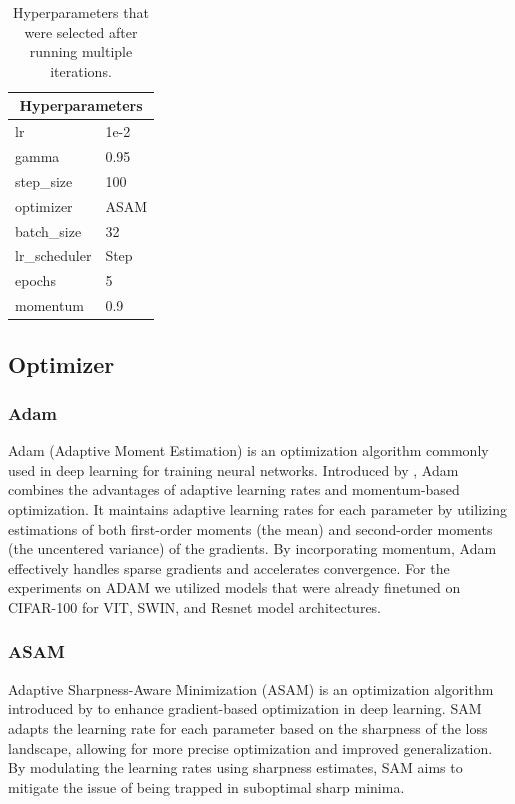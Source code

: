 \documentclass{article}
\begin{document}
\begin{table}[ht]
    \centering
    \begin{tabular}{|l|l|}
        \hline
        \multicolumn{2}{|c|}{\textbf{Hyperparameters}} \\ \hline
        lr            & 1e-2                           \\ \hline
        gamma         & 0.95                           \\ \hline
        step\_size    & 100                            \\ \hline
        optimizer     & ASAM                           \\ \hline
        batch\_size   & 32                             \\ \hline
        lr\_scheduler & Step                           \\ \hline
        epochs        & 5                              \\ \hline
        momentum      & 0.9
        \\ \hline
    \end{tabular}
    \caption{Hyperparameters that were selected after running multiple iterations.}
    \label{tab:actor_critic_hp}
\end{table}

\subsection{Optimizer}

\subsubsection{Adam}
Adam (Adaptive Moment Estimation) is an optimization algorithm commonly used in deep learning for training neural networks. 
Introduced by \cite{Kingma2014AdamAM}, Adam combines the advantages of adaptive learning rates and momentum-based optimization. 
It maintains adaptive learning rates for each parameter by utilizing estimations of both first-order moments (the mean) and second-order moments (the uncentered variance) of the gradients. 
By incorporating momentum, Adam effectively handles sparse gradients and accelerates convergence. 
For the experiments on ADAM we utilized models that were already finetuned on CIFAR-100 for VIT, SWIN, and Resnet model architectures.

\subsubsection{ASAM}
Adaptive Sharpness-Aware Minimization (ASAM) is an optimization algorithm introduced by \cite{DBLP:journals/corr/abs-2102-11600} to enhance gradient-based optimization in deep learning. 
SAM adapts the learning rate for each parameter based on the sharpness of the loss landscape, allowing for more precise optimization and improved generalization. 
By modulating the learning rates using sharpness estimates, SAM aims to mitigate the issue of being trapped in suboptimal sharp minima.
\end{document}
